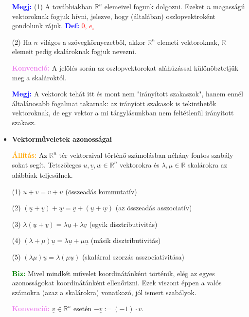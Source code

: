 \documentclass[../../szobeli.tex]{subfiles}
\begin{document}
\begin{itemize}
            \textcolor{blue}{\textbf{Megj:}} (1) A továbbiakban $\mathbb{R}^n$ elemeivel fogunk dolgozni. Ezeket $n$ magasságú vektoroknak fogjuk hívni, jelezve, hogy (általában) oszlopvektroként gondolunk rájuk. \textcolor{blue}{\textbf{Def:}} \textcolor{red}{\underline{0}, \underline{$e_i$}}

            (2) Ha $n$ világos a szövegkörnyezetből, akkor $\mathbb{R}^n$ elemeti vektoroknak, $\mathbb{R}$ elemeit pedig skalároknak fogjuk nevezni. 

            \textcolor{violet}{\textbf{Konvenció:}} A jelölés során az oszlopvektorokat aláhúzással különöbztetjük meg a skalároktól.

            \textcolor{blue}{\textbf{Megj:}} A vektorok tehát itt és mont nem "irányított szakaszok", hanem ennél általánosabb fogalmat takarnak: az irányíott szakasok is tekinthetők vektoroknak, de egy vektor a mi tárgylásunkban nem feltétlenül irányított szakasz.

        \item \textbf{Vektorműveletek azonosságai}
        
            \textcolor{orange}{\textbf{Állítás:}} Az $\mathbb{R}^n$ tér vektoraival történő számolásban néhány fontos szabály sokat segít. Tetszőleges $\underline{u,v,w} \in \mathbb{R}^n$ vektorokra és $\lambda, \mu \in \mathbb{R}$ skalárokra az alábbiak teljesülnek.

            (1) $\underline{u} + \underline{v} = \underline{v} + \underline{u}$ (összeadás kommutatív)
            
            (2) $(\underline{u} + \underline{v}) + \underline{w} = \underline{v} + (\underline{u} + \underline{w})$ (az összeadás asszociatív)
            
            (3) $\lambda(\underline{u} + \underline{v}) = \lambda \underline{u} + \lambda \underline{v}$ (egyik disztributivitás)
            
            (4) $(\lambda + \mu)\underline{u} = \lambda \underline{u} + \mu \underline{u}$ (másik disztributivitás)
            
            (5) $(\lambda\mu)\underline{u} = \lambda(\mu\underline{u})$ (skalárral szorzás asszociativitása)

            \textcolor{green}{\textbf{Biz:}} Mivel mindkét művelet koordinátánként történik, elég az egyes azonosságokat koordinátánként ellenőrizni. Ezek viszont éppen a valós számokra (azaz a skalárokra) vonatkozó, jól ismert szabályok.

            \textcolor{violet}{\textbf{Konvenció:}} $\underline{v} \in \mathbb{R}^n$ esetén $-\underline{v} := (-1) \cdot v$.
            

\end{itemize}
\end{document}

